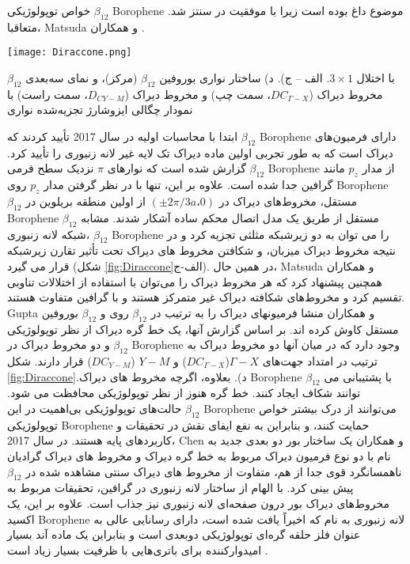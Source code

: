 خواص توپولوژیکی $\beta_{12}$ \gls{Borophene} موضوع داغ بوده است زیرا با موفقیت در  سنتز شد.\cite{mannixSynthesisBorophenesAnisotropic2015} متعاقبا، \gls{Matsuda} و همکاران \cite{fengDiracFermionsBorophene2017}. 
\begin{figure*}
    \centering
    \texttt{[image: Diraccone.png]}
    \caption{مخروط‌های دیراک و شبکه‌های الف) بوروفین لانه زنبوری. ب) بوروفین $\beta_{12}$. ج) بوروفین} $\beta_{12}$ با اختلال $3\times 1$. الف – ج). د) ساختار نواری بوروفین $\beta_{12}$ (مرکز)، و نمای سه‌بعدی مخروط دیراک ($DC_{\Gamma-X}$، سمت چپ) و مخروط دیراک ($D_{CY-M}$، سمت راست) با نمودار چگالی ایزوشارژ تجزیه‌شده نواری
    \label{fig:Diraccone}
\end{figure*}
ابتدا با محاسبات اولیه در سال 2017 تأیید کردند که $\beta_{12}$ \gls{Borophene} دارای فرمیون‌های دیراک است که به طور تجربی اولین ماده دیراک تک لایه غیر لانه زنبوری را تأیید کرد. گزارش شده است که نوارهای $\pi$ نزدیک سطح فرمی $\beta_{12}$ \gls{Borophene} از مدار $p_z$ مانند گرافین جدا شده است. علاوه بر این، تنها با در نظر گرفتن مدار $p_z$ روی \gls{Borophene} $\beta_{12}$ مستقل، مخروط‌های دیراک در $(±2\pi/3a،0)$ از اولین منطقه بریلوین  در \gls{Borophene} $\beta_{12}$ مستقل از طریق یک مدل اتصال محکم ساده آشکار شدند. مشابه شبکه لانه زنبوری، $\beta_{12}$ \gls{Borophene} را می توان به دو زیرشبکه مثلثی تجزیه کرد و در نتیجه مخروط دیراک میزبان، و شکافتن مخروط های دیراک تحت تأثیر تقارن زیرشبکه قرار می گیرد (شکل \ref{fig:Diraccone}الف-ج). در همین حال، \gls{Matsuda} و همکاران همچنین پیشنهاد کرد که هر مخروط دیراک را می‌توان با استفاده از اختلالات تناوبی تقسیم کرد و مخروط‌های شکافته دیراک غیر متمرکز هستند و با گرافین متفاوت هستند. \gls{Gupta} و همکاران \cite{guptaDiracConesNodal2018} منشا فرمیونهای دیراک را به ترتیب در $\beta_{12}$ روی  و $\beta_{12}$ بوروفین مستقل کاوش کرده اند. بر اساس گزارش آنها، یک خط گره دیراک از نظر توپولوژیکی و دو مخروط دیراک در $\beta_{12}$ \gls{Borophene} وجود دارد که در میان آنها دو مخروط دیراک به ترتیب در امتداد جهت‌های $\Gamma-X$($DC_{\Gamma-X}$) و $Y-M$ ($DC_{Y-M}$) قرار دارند. شکل \ref{fig:Diraccone}.د). بعلاوه، اگرچه مخروط های دیراک \gls{Borophene} $\beta_{12}$ با پشتیبانی  می توانند شکاف ایجاد کنند. خط گره هنوز از نظر توپولوژیکی محافظت می شود. حالت‌های توپولوژیکی بی‌اهمیت در این $\beta_{12}$ \gls{Borophene} می‌توانند از درک بیشتر خواص توپولوژیکی \gls{Borophene} حمایت کنند، و بنابراین به نفع ایفای نقش در تحقیقات و کاربردهای پایه هستند. در سال 2017، \gls{Chen} و همکاران \cite{zhangDiracNodalLines2017} یک ساختار بور دو بعدی جدید به نام  با دو نوع فرمیون دیراک مربوط به خط گره دیراک و مخروط های دیراک گرادیان ناهمسانگرد قوی جدا از هم، متفاوت از مخروط های دیراک سنتی مشاهده شده در $\beta_{12}$ پیش بینی کرد. با الهام از ساختار لانه زنبوری در گرافین، تحقیقات مربوط به مخروط‌های دیراک بور درون صفحه‌ای لانه زنبوری نیز جذاب است. علاوه بر این، یک اکسید \gls{Borophene} لانه زنبوری به نام  که اخیراً یافت شده است، دارای رسانایی عالی به عنوان فلز حلقه گره‌ای توپولوژیکی دوبعدی است و بنابراین یک ماده آند بسیار امیدوارکننده برای باتری‌هایی با ظرفیت بسیار زیاد است \cite{hu2DHoneycombBorophene2020}. 

